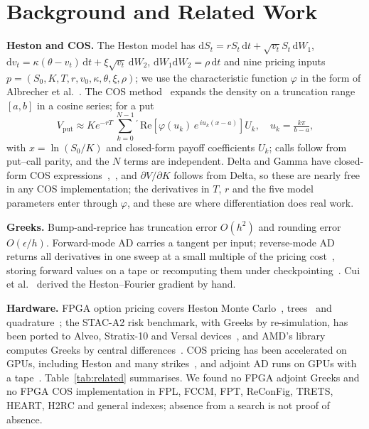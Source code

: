 \documentclass[conference]{IEEEtran}
\begin{document}
\section{Background and Related Work}
\label{sec:background}
\textbf{Heston and COS.} The Heston model has $\mathrm{d}S_t = rS_t\,\mathrm{d}t + \sqrt{v_t}S_t\,\mathrm{d}W_1$,
$\mathrm{d}v_t = \kappa(\theta-v_t)\,\mathrm{d}t + \xi\sqrt{v_t}\,\mathrm{d}W_2$,
$\mathrm{d}W_1\mathrm{d}W_2=\rho\,\mathrm{d}t$ and nine pricing inputs
$p=(S_0,K,T,r,v_0,\kappa,\theta,\xi,\rho)$; we use the characteristic function $\varphi$ in the
form of Albrecher et al.~\cite{albrecher}. The COS method~\cite{fang} expands the density on a
truncation range $[a,b]$ in a cosine series; for a put
\begin{equation}
V_{\mathrm{put}} \approx K e^{-rT}\,{\sum_{k=0}^{N-1}}{}^{\prime}\,
\mathrm{Re}\!\left[\varphi(u_k)\,e^{\,iu_k(x-a)}\right] U_k,\quad u_k=\tfrac{k\pi}{b-a},
\label{eq:cos}
\end{equation}
with $x=\ln(S_0/K)$ and closed-form payoff coefficients $U_k$; calls follow from put--call parity,
and the $N$ terms are independent. Delta and Gamma have closed-form COS
expressions~\cite[Remark~3.2]{fang},~\cite{junike}, and $\partial V/\partial K$ follows from Delta, so these
are nearly free in any COS implementation; the derivatives in $T$, $r$ and the five model parameters
enter through $\varphi$, and these are where differentiation does real work.

\textbf{Greeks.} Bump-and-reprice has truncation error $O(h^2)$ and rounding error
$O(\epsilon/h)$. Forward-mode AD carries a tangent per input; reverse-mode AD returns all
derivatives in one sweep at a small multiple of the pricing cost~\cite{griewank}, storing forward
values on a tape or recomputing them under checkpointing~\cite{griewank92}. Cui et
al.~\cite{cui} derived the Heston--Fourier gradient by hand.

\textbf{Hardware.} FPGA option pricing covers Heston Monte Carlo~\cite{deschryver,deschryver13},
trees~\cite{jin} and quadrature~\cite{tse}; the STAC-A2 risk benchmark, with Greeks by
re-simulation, has been ported to Alveo, Stratix-10 and Versal devices~\cite{klai,klaih2rc,klai24},
and AMD's library computes Greeks by central differences~\cite{vitisquant}. COS pricing has been
accelerated on GPUs, including Heston and many strikes~\cite{zhang09,zhang14}, and adjoint AD runs on
GPUs with a tape~\cite{gremse}. Table~\ref{tab:related} summarises. We found no FPGA adjoint Greeks
and no FPGA COS implementation in FPL, FCCM, FPT, ReConFig, TRETS, HEART, H2RC and general indexes;
absence from a search is not proof of absence.
\end{document}
